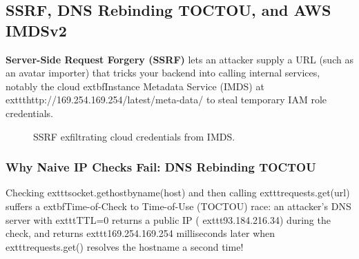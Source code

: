 \subsection{SSRF, DNS Rebinding TOCTOU, and AWS IMDSv2}

\textbf{Server-Side Request Forgery (SSRF)} lets an attacker supply a URL (such as an avatar importer) that tricks your backend into calling internal services, notably the cloud 	extbf{Instance Metadata Service (IMDS)} at 	exttt{http://169.254.169.254/latest/meta-data/} to steal temporary IAM role credentials.

\begin{figure}[htbp]
\centering
{}
\caption{SSRF exfiltrating cloud credentials from IMDS.}
\label{fig:v1-ch06-ssrf-imds}
\end{figure}

\subsubsection{Why Naive IP Checks Fail: DNS Rebinding TOCTOU}
Checking 	exttt{socket.gethostbyname(host)} and then calling 	exttt{requests.get(url)} suffers a 	extbf{Time-of-Check to Time-of-Use (TOCTOU)} race: an attacker's DNS server with 	exttt{TTL=0} returns a public IP (	exttt{93.184.216.34}) during the check, and returns 	exttt{169.254.169.254} milliseconds later when 	exttt{requests.get()} resolves the hostname a second time!

